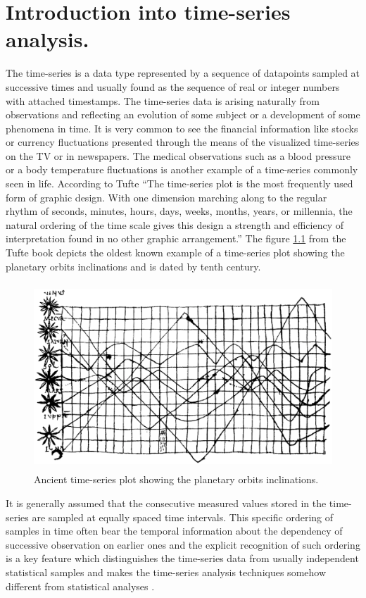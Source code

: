 \chapter{Introduction into time-series analysis.}
The time-series is a data type represented by a sequence of datapoints sampled at successive times and usually found as the sequence of real or integer numbers with attached timestamps. 
The time-series data is arising naturally from observations and reflecting an evolution of some subject or a development of some phenomena in time. It is very common to see the financial information like stocks or currency fluctuations presented through the means of the visualized time-series on the TV or in newspapers. The medical observations such as a blood pressure or a body temperature fluctuations is another example of a time-series commonly seen in life. According to Tufte \cite{citeulike:1454223} ``The time-series plot is the most frequently used form of graphic design. With one dimension marching along to the regular rhythm of seconds, minutes, hours, days, weeks, months, years, or millennia, the natural ordering of the time scale gives this design a strength and efficiency of interpretation found in no other graphic arrangement.'' The figure \ref{fig:10century} from the Tufte book depicts the oldest known example of a time-series plot showing the planetary orbits inclinations and is dated by tenth century.

\begin{figure}[tbp]
   \centering
   \includegraphics[height=70mm]{figures/10century.eps}
   \caption{Ancient time-series plot showing the planetary orbits inclinations.}
   \label{fig:10century}
\end{figure} 

It is generally assumed that the consecutive measured values stored in the time-series are sampled at equally spaced time intervals.
This specific ordering of samples in time often bear the temporal information about the dependency of successive observation on earlier ones and the explicit recognition of such ordering is a key feature which distinguishes the time-series data from usually independent statistical samples and makes the time-series analysis techniques somehow different from statistical analyses \cite{citeulike:3989988}. 

